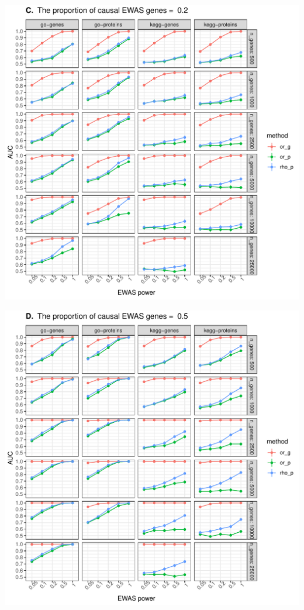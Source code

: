 \documentclass[11pt,oneside]{bristolthesis}
\begin{document}
\begin{center}\includegraphics[width=1\linewidth]{figure/06-ewas_gwas_comparison/method_test_gene_v_protein/PEC_0.2} \end{center}
\begin{center}\includegraphics[width=1\linewidth]{figure/06-ewas_gwas_comparison/method_test_gene_v_protein/PEC_0.5} \end{center}
\end{document}
